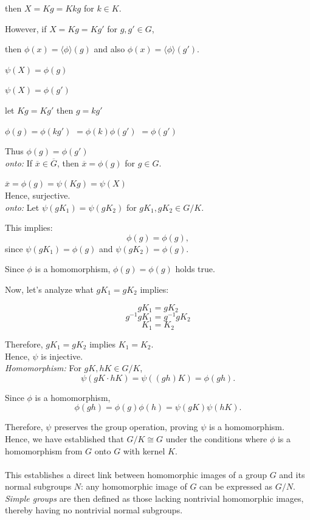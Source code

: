 then \(X= Kg = Kkg \) for \( k \in K \). 

However, if \( X = Kg = Kg' \) for \( g, g' \in G \), 

then \( \phi(x) = \langle \phi \rangle(g) \) and also \( \phi(x) = \langle \phi \rangle(g') \). 

\(\psi(X) = \phi(g)\)

\(\psi(X) = \phi(g')\)

let \(Kg=Kg'\) then \(g=kg'\)

\(\phi(g) = \phi(kg')\)
\(= \phi(k)\phi(g')\)
\(= \phi(g')\)

Thus \(\phi(g) = \phi(g')\)
\\
\textit{onto:}
If \( \overline{x} \in \overline{G} \), then \( \overline{x} = \phi(g) \) for \( g \in G \). 

\( \overline{x} = \phi(g) = \psi(Kg) = \psi(X) \)\\
Hence, surjective.
\\
\textit{onto:}
Let \( \psi(gK_1) = \psi(gK_2) \) for \( gK_1, gK_2 \in G/K \).

This implies:
\[ \phi(g) = \phi(g), \]
since \( \psi(gK_1) = \phi(g) \) and \( \psi(gK_2) = \phi(g) \).

Since \( \phi \) is a homomorphism, \( \phi(g) = \phi(g) \) holds true.

Now, let's analyze what \( gK_1 = gK_2 \) implies:

\[ gK_1 = gK_2 \]
\[ g^{-1}gK_1 = g^{-1}gK_2 \]
\[ K_1 = K_2 \]

Therefore, \( gK_1 = gK_2 \) implies \( K_1 = K_2 \).
\\
Hence, \( \psi \) is injective.\\
\textit{Homomorphism:}
For \( gK, hK \in G/K \),
   \[
   \psi(gK \cdot hK) = \psi((gh)K) = \phi(gh).
   \]

   Since \( \phi \) is a homomorphism,
   \[
   \phi(gh) = \phi(g)\phi(h) = \psi(gK)\psi(hK).
   \]

Therefore, \( \psi \) preserves the group operation, proving \( \psi \) is a homomorphism.
\\Hence, we have established that \( G/K \cong G \) under the conditions where \( \phi \) is a homomorphism from \( G \) onto \( G \) with kernel \( K \).
\\
\\
This establishes a direct link between homomorphic images of a group \( G \) and its normal subgroups \( N \): any homomorphic image of \( G \) can be expressed as \( G/N \). \\
\textit{Simple groups} are then defined as those lacking nontrivial homomorphic images, thereby having no nontrivial normal subgroups. 

